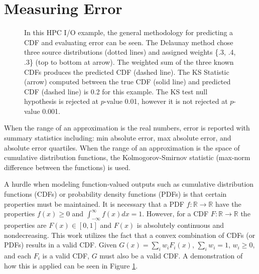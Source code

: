 \documentclass[smallextended,final]{svjour3}       %
\begin{document}
\section{Measuring Error}
\label{sec:error}

\begin{figure}[htb]
  \centering
  \vspace{-0.3cm}
  \caption{In this HPC I/O example, the general methodology for
    predicting a CDF and evaluating error can be seen. The Delaunay
    method chose three source distributions (dotted lines) and
    assigned weights \{.3, .4, .3\} (top to bottom at arrow). The
    weighted sum of the three known CDFs produces the predicted CDF
    (dashed line). The KS Statistic (arrow) computed between the true
    CDF (solid line) and predicted CDF (dashed line) is 0.2 for this
    example. The KS test null hypothesis is rejected at $p$-value
    0.01, however it is not rejected at $p$-value 0.001.
  \vspace{-.1cm}}
  \label{fig:prediction-example}
\end{figure}

When the range of an approximation is the real numbers, error is
reported with summary statistics including: min absolute error, max
absolute error, and absolute error quartiles. When the range of an
approximation is the space of cumulative distribution functions, the
Kolmogorov-Smirnov statistic (max-norm difference between the
functions) is used.

A hurdle when modeling function-valued outputs such as cumulative
distribution functions (CDFs) or probability density functions (PDFs)
is that certain properties must be maintained. It is necessary that a
PDF $f: \mathbb{R} \rightarrow \mathbb{R}$ have the properties $f(x)
\geq 0$ and $\int_{-\infty}^{\infty}f(x)dx = 1$. However, for a CDF
$F: \mathbb{R} \rightarrow \mathbb{R}$ the properties are
$F(x) \in [0,1]$ and $F(x)$ is absolutely continuous and
nondecreasing. This work utilizes the fact that a convex combination
of CDFs (or PDFs) results in a valid CDF. Given $G(x) = \sum_{i}w_i
F_i(x)$, $\sum_{i} w_i = 1$, $w_i \geq 0$, and each $F_i$ is a valid
CDF, $G$ must also be a valid CDF. A demonstration of how this is
applied can be seen in Figure \ref{fig:prediction-example}.
\end{document}
